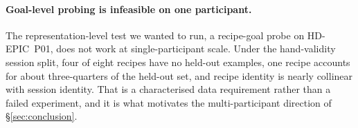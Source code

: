 \paragraph{Goal-level probing is infeasible on one participant.}
The representation-level test we wanted to run, a recipe-goal probe on
HD-EPIC~P01, does not work at single-participant scale. Under the hand-validity
session split, four of eight recipes have no held-out examples, one recipe
accounts for about three-quarters of the held-out set, and recipe identity is
nearly collinear with session identity. That is a characterised data requirement
rather than a failed experiment, and it is what motivates the multi-participant
direction of \S\ref{sec:conclusion}.